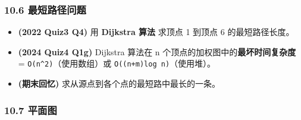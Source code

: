 \documentclass[10pt,a4paper,openany]{ctexbook}
\theoremstyle{definition}
\theoremstyle{remark}
\begin{document}
\subsubsection{10.6 最短路径问题}

\begin{itemize}
\item \textbf{(2022 Quiz3 Q4)} 用 \textbf{Dijkstra 算法} 求顶点 1 到顶点 6 的最短路径长度。
\item \textbf{(2024 Quiz4 Q1g)} Dijkstra 算法在 n 个顶点的加权图中的\textbf{最坏时间复杂度} = \texttt{O(n\^{}2)}（使用数组）或 \texttt{O((n+m)log n)}（使用堆）。
\item \textbf{(期末回忆)} 求从源点到各个点的最短路中最长的一条。

\end{itemize}

\subsubsection{10.7 平面图}
\end{document}
